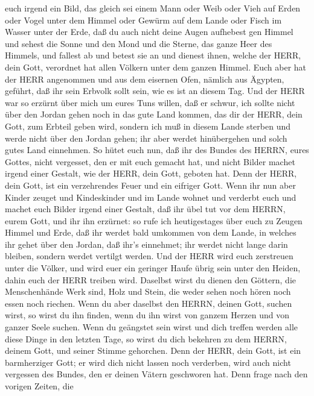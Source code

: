 euch irgend ein Bild, das gleich sei einem Mann oder Weib 
oder Vieh auf Erden oder Vogel unter dem Himmel  oder
Gewürm auf dem Lande oder Fisch im Wasser unter der Erde, 
daß du auch nicht deine Augen aufhebest gen Himmel und sehest die Sonne
und den Mond und die Sterne, das ganze Heer des Himmels, und fallest ab
und betest sie an und dienest ihnen, welche der HERR, dein Gott,
verordnet hat allen Völkern unter dem ganzen Himmel.  Euch
aber hat der HERR angenommen und aus dem eisernen Ofen, nämlich aus
Ägypten, geführt, daß ihr sein Erbvolk sollt sein, wie es ist an diesem
Tag.  Und der HERR war so erzürnt über mich um eures Tuns
willen, daß er schwur, ich sollte nicht über den Jordan gehen noch in
das gute Land kommen, das dir der HERR, dein Gott, zum Erbteil geben
wird,  sondern ich muß in diesem Lande sterben und werde
nicht über den Jordan gehen; ihr aber werdet hinübergehen und solch
gutes Land einnehmen.  So hütet euch nun, daß ihr des
Bundes des HERRN, eures Gottes, nicht vergesset, den er mit euch gemacht
hat, und nicht Bilder machet irgend einer Gestalt, wie der HERR, dein
Gott, geboten hat.  Denn der HERR, dein Gott, ist ein
verzehrendes Feuer und ein eifriger Gott.  Wenn ihr nun
aber Kinder zeuget und Kindeskinder und im Lande wohnet und verderbt
euch und machet euch Bilder irgend einer Gestalt, daß ihr übel tut vor
dem HERRN, eurem Gott, und ihr ihn erzürnet:  so rufe ich
heutigestages über euch zu Zeugen Himmel und Erde, daß ihr werdet bald
umkommen von dem Lande, in welches ihr gehet über den Jordan, daß ihr's
einnehmet; ihr werdet nicht lange darin bleiben, sondern werdet vertilgt
werden.  Und der HERR wird euch zerstreuen unter die
Völker, und wird euer ein geringer Haufe übrig sein unter den Heiden,
dahin euch der HERR treiben wird.  Daselbst wirst du dienen
den Göttern, die Menschenhände Werk sind, Holz und Stein, die weder
sehen noch hören noch essen noch riechen.  Wenn du aber
daselbst den HERRN, deinen Gott, suchen wirst, so wirst du ihn finden,
wenn du ihn wirst von ganzem Herzen und von ganzer Seele suchen.
 Wenn du geängstet sein wirst und dich treffen werden alle
diese Dinge in den letzten Tage, so wirst du dich bekehren zu dem HERRN,
deinem Gott, und seiner Stimme gehorchen.  Denn der HERR,
dein Gott, ist ein barmherziger Gott; er wird dich nicht lassen noch
verderben, wird auch nicht vergessen des Bundes, den er deinen Vätern
geschworen hat.  Denn frage nach den vorigen Zeiten, die
